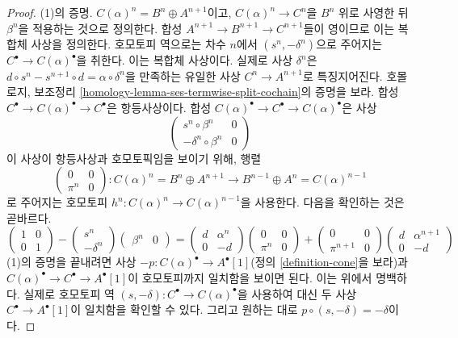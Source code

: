 \begin{proof}
(1)의 증명. $C(\alpha)^n = B^n \oplus A^{n + 1}$이고,
$C(\alpha)^n \to C^n$을 $B^n$ 위로 사영한 뒤 $\beta^n$을 적용하는
것으로 정의한다. 합성 $A^{n + 1} \to B^{n + 1} \to C^{n + 1}$들이
영이므로 이는 복합체 사상을 정의한다. 호모토피 역으로는 차수
$n$에서 $(s^n , -\delta^n)$으로 주어지는
$C^\bullet \to C(\alpha)^\bullet$을 취한다. 이는 복합체 사상이다.
실제로 사상 $\delta^n$은
$d \circ s^n - s^{n + 1} \circ d = \alpha \circ \delta^n$을 만족하는
유일한 사상 $C^n \to A^{n + 1}$로 특징지어진다. 호몰로지, 보조정리
\ref{homology-lemma-ses-termwise-split-cochain}의 증명을 보라.
합성 $C^\bullet \to C(\alpha)^\bullet \to C^\bullet$은 항등사상이다.
합성 $C(\alpha)^\bullet \to C^\bullet \to C(\alpha)^\bullet$은 사상
$$
\left(
\begin{matrix}
s^n \circ \beta^n & 0 \\
-\delta^n \circ \beta^n & 0
\end{matrix}
\right)
$$
이 사상이 항등사상과 호모토픽임을 보이기 위해, 행렬
$$
\left(
\begin{matrix}
0 & 0 \\
\pi^n & 0
\end{matrix}
\right) : C(\alpha)^n = B^n \oplus A^{n + 1} \to
B^{n - 1} \oplus A^n = C(\alpha)^{n - 1}
$$
로 주어지는 호모토피
$h^n : C(\alpha)^n \to C(\alpha)^{n - 1}$을 사용한다.
다음을 확인하는 것은 곧바르다.
$$
\left(
\begin{matrix}
1 & 0 \\
0 & 1
\end{matrix}
\right)
-
\left(
\begin{matrix}
s^n \\
-\delta^n
\end{matrix}
\right)
\left(
\begin{matrix}
\beta^n & 0
\end{matrix}
\right)
=
\left(
\begin{matrix}
d & \alpha^n \\
0 & -d
\end{matrix}
\right)
\left(
\begin{matrix}
0 & 0 \\
\pi^n & 0
\end{matrix}
\right)
+
\left(
\begin{matrix}
0 & 0 \\
\pi^{n + 1} & 0
\end{matrix}
\right)
\left(
\begin{matrix}
d & \alpha^{n + 1} \\
0 & -d
\end{matrix}
\right)
$$
(1)의 증명을 끝내려면 사상
$-p : C(\alpha)^\bullet \to A^\bullet[1]$(정의
\ref{definition-cone}을 보라)과
$C(\alpha)^\bullet \to C^\bullet \to A^\bullet[1]$이 호모토피까지
일치함을 보이면 된다. 이는 위에서 명백하다. 실제로 호모토피 역
$(s, -\delta) : C^\bullet \to C(\alpha)^\bullet$을 사용하여 대신
두 사상 $C^\bullet \to A^\bullet[1]$이 일치함을 확인할 수 있다.
그리고 원하는 대로 $p \circ (s, -\delta) = -\delta$이다.


\end{proof}
